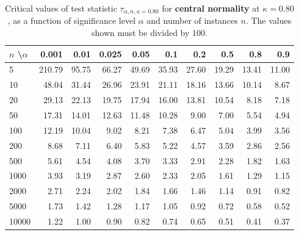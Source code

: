 \documentclass[
  a4paper,
]{article}
\begin{document}
\begin{table}
\begin{center}
\caption{Critical values of test statistic $\tau_{\alpha, n, \kappa = 0.80}$ for
\textbf{central normality} at $\kappa = 0.80$, as a function of significance 
level $\alpha$ and number of instances $n$. The values shown must be divided by $100$.}
\label{tab:central-normality-critical-statistic}
\begin{tabular}{l | r r r r r r r r r}

\toprule
$n$ \textbackslash $\alpha$ & 0.001 & 0.01 & 0.025 & 0.05 & 0.1 & 0.2 & 0.5 & 0.8 & 0.9 \\

\midrule
    5 & 210.79 & 95.75 & 66.27 & 49.69 & 35.93 & 27.60 & 19.29 & 13.41 & 11.00 \\
   10 &  48.04 & 31.44 & 26.96 & 23.91 & 21.11 & 18.16 & 13.66 & 10.14 &  8.67 \\
   20 &  29.13 & 22.13 & 19.75 & 17.94 & 16.00 & 13.81 & 10.54 &  8.18 &  7.18 \\
   50 &  17.31 & 14.01 & 12.63 & 11.48 & 10.28 &  9.00 &  7.00 &  5.54 &  4.94 \\
  100 &  12.19 & 10.04 &  9.02 &  8.21 &  7.38 &  6.47 &  5.04 &  3.99 &  3.56 \\
  200 &   8.68 &  7.11 &  6.40 &  5.83 &  5.22 &  4.57 &  3.59 &  2.86 &  2.56 \\ 
  500 &   5.61 &  4.54 &  4.08 &  3.70 &  3.33 &  2.91 &  2.28 &  1.82 &  1.63 \\
 1000 &   3.93 &  3.19 &  2.87 &  2.60 &  2.33 &  2.05 &  1.61 &  1.29 &  1.15 \\
 2000 &   2.71 &  2.24 &  2.02 &  1.84 &  1.66 &  1.46 &  1.14 &  0.91 &  0.82 \\
 5000 &   1.73 &  1.42 &  1.28 &  1.17 &  1.05 &  0.92 &  0.72 &  0.58 &  0.52 \\
10000 &   1.22 &  1.00 &  0.90 &  0.82 &  0.74 &  0.65 &  0.51 &  0.41 &  0.37 \\
\bottomrule
\end{tabular}
\end{center}
\end{table}
\end{document}
